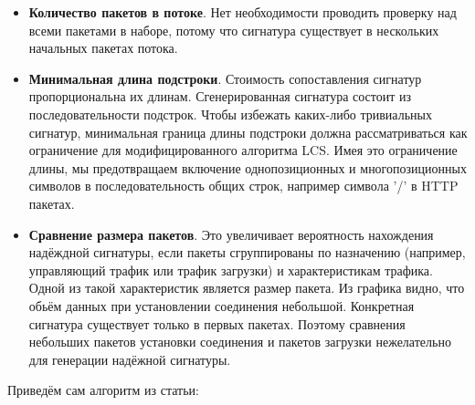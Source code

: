 \begin{itemize}
    \item \textbf{Количество пакетов в потоке}.
    Нет необходимости проводить проверку над всеми пакетами в наборе,
    потому что сигнатура существует в нескольких начальных пакетах потока.
    \item \textbf{Минимальная длина подстроки}. Стоимость сопоставления сигнатур пропорциональна их длинам.
    Сгенерированная сигнатура состоит из последовательности подстрок.
    Чтобы избежать каких-либо тривиальных сигнатур,
    минимальная граница длины подстроки должна рассматриваться как ограничение для модифицированного алгоритма LCS.
    Имея это ограничение длины, мы предотвращаем включение однопозиционных и многопозиционных символов в последовательность общих строк,
    например символа '/' в HTTP пакетах.
    \item \textbf{Сравнение размера пакетов}. Это увеличивает вероятность нахождения надёждной сигнатуры,
    если пакеты сгруппированы по назначению (например, управляющий трафик или трафик загрузки) и характеристикам трафика.
    Одной из такой характеристик является размер пакета.
    Из графика видно, что обьём данных при установлении соединения небольшой. Конкретная сигнатура существует только в первых пакетах.
    Поэтому сравнения небольших пакетов установки соединения и пакетов загрузки нежелательно для генерации надёжной сигнатуры.

\end{itemize}

Приведём сам алгоритм из статьи:

